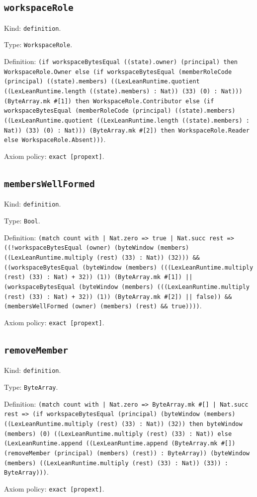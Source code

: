 \documentclass[11pt]{article}
\begin{document}
\subsection*{\texttt{workspaceRole}}
\noindent Kind: \texttt{definition}.\par
\noindent Type: \texttt{WorkspaceRole}.\par
\noindent Definition: \texttt{(if workspaceBytesEqual ((state).owner) (principal) then WorkspaceRole.Owner else (if workspaceBytesEqual (memberRoleCode (principal) ((state).members) ((LexLeanRuntime.quotient ((LexLeanRuntime.length ((state).members) : Nat)) (33) (0) : Nat))) (ByteArray.mk \#[1]) then WorkspaceRole.Contributor else (if workspaceBytesEqual (memberRoleCode (principal) ((state).members) ((LexLeanRuntime.quotient ((LexLeanRuntime.length ((state).members) : Nat)) (33) (0) : Nat))) (ByteArray.mk \#[2]) then WorkspaceRole.Reader else WorkspaceRole.Absent)))}.\par
\noindent Axiom policy: \texttt{exact [propext]}.\par
\subsection*{\texttt{membersWellFormed}}
\noindent Kind: \texttt{definition}.\par
\noindent Type: \texttt{Bool}.\par
\noindent Definition: \texttt{(match count with | Nat.zero => true | Nat.succ rest => ((!workspaceBytesEqual (owner) (byteWindow (members) ((LexLeanRuntime.multiply (rest) (33) : Nat)) (32))) \&\& ((workspaceBytesEqual (byteWindow (members) (((LexLeanRuntime.multiply (rest) (33) : Nat) + 32)) (1)) (ByteArray.mk \#[1]) || (workspaceBytesEqual (byteWindow (members) (((LexLeanRuntime.multiply (rest) (33) : Nat) + 32)) (1)) (ByteArray.mk \#[2]) || false)) \&\& (membersWellFormed (owner) (members) (rest) \&\& true))))}.\par
\noindent Axiom policy: \texttt{exact [propext]}.\par
\subsection*{\texttt{removeMember}}
\noindent Kind: \texttt{definition}.\par
\noindent Type: \texttt{ByteArray}.\par
\noindent Definition: \texttt{(match count with | Nat.zero => ByteArray.mk \#[] | Nat.succ rest => (if workspaceBytesEqual (principal) (byteWindow (members) ((LexLeanRuntime.multiply (rest) (33) : Nat)) (32)) then byteWindow (members) (0) ((LexLeanRuntime.multiply (rest) (33) : Nat)) else (LexLeanRuntime.append ((LexLeanRuntime.append (ByteArray.mk \#[]) (removeMember (principal) (members) (rest)) : ByteArray)) (byteWindow (members) ((LexLeanRuntime.multiply (rest) (33) : Nat)) (33)) : ByteArray)))}.\par
\noindent Axiom policy: \texttt{exact [propext]}.\par
\end{document}
